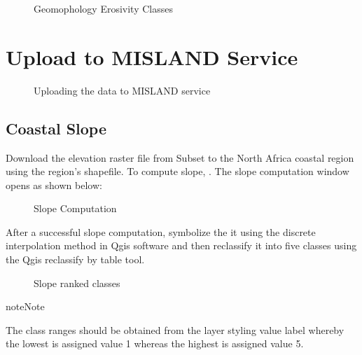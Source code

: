 \documentclass[letterpaper,10pt,english]{sphinxmanual}
\let\sphinxpxdimen\pdfpxdimen\else\newdimen\sphinxpxdimen
\begin{document}
\begin{figure}[H]
\centering
\capstart

\noindent{}
\caption{Geomophology Erosivity Classes}\label{\detokenize{Preprocessing/CVI:id5}}\end{figure}


\section{Upload to MISLAND Service}
\label{\detokenize{Preprocessing/CVI:upload-to-misland-service}}
\begin{figure}[H]
\centering
\capstart

\noindent\sphinxincludegraphics[width=642\sphinxpxdimen,height=597\sphinxpxdimen]{{geomophologyUpload}.png}
\caption{Uploading the data to MISLAND service}\label{\detokenize{Preprocessing/CVI:id6}}\end{figure}


\subsection{Coastal Slope}
\label{\detokenize{Preprocessing/CVI:coastal-slope}}
\sphinxAtStartPar
Download the elevation raster file from 
Subset to the North Africa coastal region using the region’s shapefile.
To compute slope, . The slope computation window opens as shown below:

\begin{figure}[H]
\centering
\capstart

\noindent{}
\caption{Slope Computation}\label{\detokenize{Preprocessing/CVI:id7}}\end{figure}

\sphinxAtStartPar
After a successful slope computation, symbolize the it using the discrete interpolation method in Qgis software and then reclassify it into five classes using the Qgis reclassify by table tool.

\begin{figure}[H]
\centering
\capstart

\noindent{}
\caption{Slope ranked classes}\label{\detokenize{Preprocessing/CVI:id8}}\end{figure}

\begin{sphinxadmonition}{note}{Note}

\sphinxAtStartPar
The class ranges should be obtained from the layer styling value label whereby the lowest is assigned value 1 whereas the highest is assigned value 5.
\end{sphinxadmonition}
\end{document}
